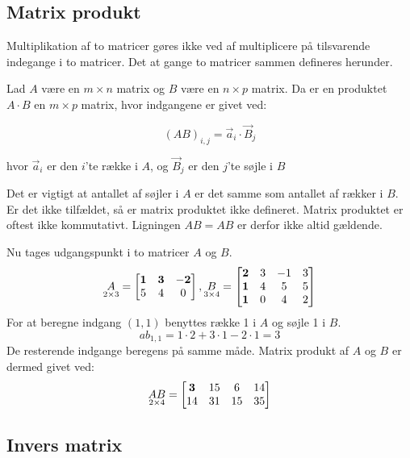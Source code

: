 \subsection{Matrix produkt}
Multiplikation af to matricer gøres ikke ved af multiplicere på tilsvarende indegange i to matricer. Det at gange to matricer sammen defineres herunder. 
\begin{defn} 
Lad $A$ være en $m \times n$ matrix og $B$ være en $n \times p$ matrix. Da er en produktet $A \cdot B$ en $m \times p$ matrix, hvor indgangene er givet ved: 

$$(AB)_{i,j} = \vec{a}_i \cdot \vec{B}_j$$

hvor $\vec{a}_i$ er den $i$'te række i $A$, og $\vec{B}_j$ er den $j$'te søjle i $B$
\label{def:(matrixprodukt)}
\end{defn}
Det er vigtigt at antallet af søjler i $A$ er det samme som antallet af rækker i $B$. Er det ikke tilfældet, så er matrix produktet ikke defineret. Matrix produktet er oftest ikke kommutativt. Ligningen $AB=AB$ er derfor ikke altid gældende. 
\begin{eks}
Nu tages udgangspunkt i to matricer $A$ og $B$. 
\begin{align*}
\underset{2 \times 3}{A}= \begin{bmatrix}
	\bf{1} & \bf{3} & \bf{-2} \\
	5 & 4 & 0 	
\end{bmatrix},
\underset{3 \times 4}{B}= \begin{bmatrix}
	\bf{2} & 3 & -1 & 3 \\
	\bf{1} & 4 & 5 & 5\\
	\bf{1} & 0 & 4 & 2
\end{bmatrix}  
\end{align*}
For at beregne indgang $(1,1)$ benyttes række 1 i $A$ og søjle 1 i $B$. 
$$ab_{1,1}=1\cdot 2+3\cdot 1-2 \cdot 1 = 3$$ 
De resterende indgange beregens på samme måde. 
Matrix produkt af $A$ og $B$ er dermed givet ved:
\begin{align*}
\underset{2 \times 4}{AB}= \begin{bmatrix}
	\bf{3} & 15 & 6 & 14 \\
	14 & 31 & 15 & 35
\end{bmatrix}  
\end{align*}
\end{eks}



\subsection{Invers matrix}

